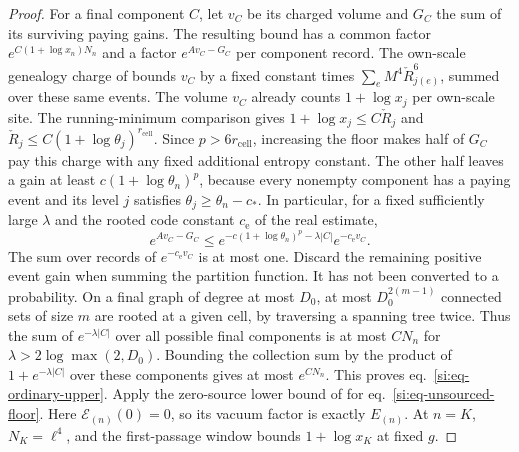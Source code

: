 \documentclass[11pt,letterpaper,reqno]{amsart}
\numberwithin{equation}{section}
\renewcommand{\eqref}[1]{\textup{eq.~\ref{#1}}}
\theoremstyle{definition}
\theoremstyle{remark}
\begin{document}
\begin{proof}
For a final component $C$, let $v_C$ be its charged volume and
$G_C$ the sum of its surviving paying gains. The resulting bound
has a common factor $e^{C(1+\log x_n)N_n}$ and a factor
$e^{A v_C-G_C}$ per component record. The own-scale genealogy
charge of \cite[Lemma~8.2]{RT} bounds $v_C$ by a fixed constant times
$\sum_e M^4\check R_{j(e)}^6$, summed over these same events.
The volume $v_C$ already counts $1+\log x_j$ per own-scale site.
The running-minimum comparison gives $1+\log x_j\le C\check R_j$
and $\check R_j\le C(1+\log\theta_j)^{r_{\mathrm{cell}}}$.
Since $p>6r_{\mathrm{cell}}$, increasing the floor makes half of $G_C$ pay this
charge with any fixed additional entropy constant. The other
half leaves a gain at least $c(1+\log\theta_n)^p$, because every
nonempty component has a paying event and its level $j$ satisfies
$\theta_j\ge\theta_n-c_*$. In particular, for a fixed sufficiently large
$\lambda$ and the rooted code constant $c_{\mathrm e}$ of the
real estimate,
\[
   e^{A v_C-G_C}\le
       e^{-c(1+\log\theta_n)^p-\lambda|C|}e^{-c_{\mathrm e}v_C}.
\]
The sum over records of $e^{-c_{\mathrm e}v_C}$ is at most one.
Discard the remaining positive event gain when summing the
partition function. It has not been converted to a probability.
On a final graph of degree at most $D_0$, at most
$D_0^{2(m-1)}$ connected sets of size $m$ are rooted at a given
cell, by traversing a spanning tree twice. Thus the sum of
$e^{-\lambda|C|}$ over all possible final components is at most
$C N_n$ for $\lambda>2\log\max(2,D_0)$. Bounding the collection sum
by the product of $1+e^{-\lambda|C|}$ over these components gives
at most $e^{C N_n}$. This proves \eqref{si:eq-ordinary-upper}.
Apply the zero-source lower bound of \cite[Theorem~E]{RT} for
\eqref{si:eq-unsourced-floor}. Here $\mathcal E_{(n)}(0)=0$, so its
vacuum factor is exactly $E_{(n)}$. At $n=K$, $N_K=\ell^4$, and
the first-passage window bounds $1+\log x_K$ at fixed $g$.
\end{proof}
\end{document}
